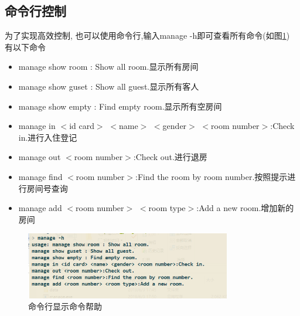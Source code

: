 \documentclass[UTF8]{ctexart}
\begin{document}
  \subsection{命令行控制}
    为了实现高效控制, 也可以使用命令行,输入manage -h即可查看所有命令(如图\ref{fig:c_h})
    有以下命令
    \begin{itemize}
      \item manage show room : Show all room.显示所有房间
      \item manage show guset : Show all guest.显示所有客人
      \item manage show empty : Find empty room.显示所有空房间
      \item manage in $<$id card$>$ $<$name$>$ $<$gender$>$ $<$room number$>$:Check in.进行入住登记
      \item manage out $<$room number$>$:Check out.进行退房
      \item manage find $<$room number$>$:Find the room by room number.按照提示进行房间号查询
      \item manage add $<$room number$>$ $<$room type$>$:Add a new room.增加新的房间
    \end{itemize}
    \begin{figure}[H]
      \centering
      \includegraphics[width=0.8\textwidth]{c_h}
      \caption{命令行显示命令帮助}
      \label{fig:c_h}
    \end{figure}
\end{document}
